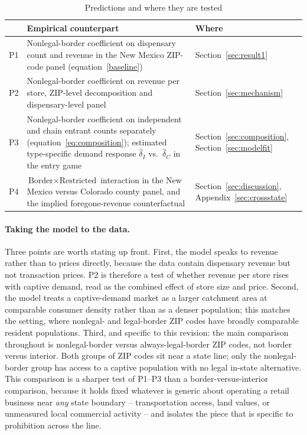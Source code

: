 \documentclass[english,12pt]{article}
\begin{document}
\begin{table}[htbp]
\centering
\caption{Predictions and where they are tested}
\label{tab:predictions}
\begin{tabular}{@{}p{} p{} p{}@{}}
\toprule
& Empirical counterpart & Where \\
\midrule
P1 & Nonlegal-border coefficient on dispensary count and revenue in the New Mexico ZIP-code panel (equation~\ref{baseline}) & Section~\ref{sec:result1} \\[4pt]
P2 & Nonlegal-border coefficient on revenue per store, ZIP-level decomposition and dispensary-level panel & Section~\ref{sec:mechanism} \\[4pt]
P3 & Nonlegal-border coefficient on independent and chain entrant counts separately (equation~\ref{eq:composition}); estimated type-specific demand response $\hat\delta_I$ vs.\ $\hat\delta_C$ in the entry game & Section~\ref{sec:composition}, Section~\ref{sec:modelfit} \\[4pt]
P4 & $\text{Border}\times\text{Restricted}$ interaction in the New Mexico versus Colorado county panel, and the implied foregone-revenue counterfactual & Section~\ref{sec:discussion}, Appendix~\ref{sec:crossstate} \\
\bottomrule
\end{tabular}
\end{table}

\paragraph{Taking the model to the data.} Three points are worth stating up front. First, the model speaks to revenue rather than to prices directly, because the data contain dispensary revenue but not transaction prices. P2 is therefore a test of whether revenue per store rises with captive demand, read as the combined effect of store size and price. Second, the model treats a captive-demand market as a larger catchment area at comparable consumer density rather than as a denser population; this matches the setting, where nonlegal- and legal-border ZIP codes have broadly comparable resident populations. Third, and specific to this revision: the main comparison throughout is nonlegal-border versus always-legal-border ZIP codes, not border versus interior. Both groups of ZIP codes sit near a state line; only the nonlegal-border group has access to a captive population with no legal in-state alternative. This comparison is a sharper test of P1--P3 than a border-versus-interior comparison, because it holds fixed whatever is generic about operating a retail business near \emph{any} state boundary -- transportation access, land values, or unmeasured local commercial activity -- and isolates the piece that is specific to prohibition across the line.
\end{document}
